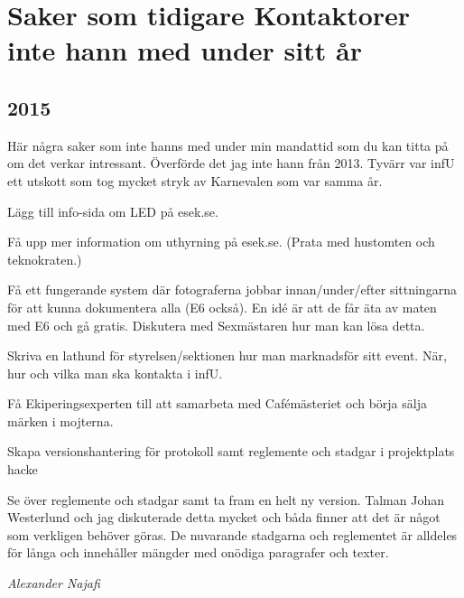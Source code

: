 \documentclass[10pt]{article}
\begin{document}
\section{Saker som tidigare Kontaktorer inte hann med under sitt år}

\subsection{2015}
Här några saker som inte hanns med under min mandattid som du kan titta på om det verkar intressant. Överförde det jag inte hann från 2013. Tyvärr var infU ett utskott som tog mycket stryk av Karnevalen som var samma år.
\begin{tightdashlist}
    \item Lägg till info-sida om LED på esek.se.
    \item Få upp mer information om uthyrning på esek.se. (Prata med hustomten och teknokraten.)
    \item Få ett fungerande system där fotograferna jobbar innan/under/efter sittningarna för att kunna dokumentera alla (E6 också). En idé är att de får äta av maten med E6 och gå gratis. Diskutera med Sexmästaren hur man kan lösa detta.
    \item Skriva en lathund för styrelsen/sektionen hur man marknadsför sitt event. När, hur och vilka man ska kontakta i infU.
    \item Få Ekiperingsexperten till att samarbeta med Cafémästeriet och börja sälja märken i mojterna.
    \item Skapa versionshantering för protokoll samt reglemente och stadgar i projektplats hacke
    \item Se över reglemente och stadgar samt ta fram en helt ny version. Talman Johan Westerlund och jag diskuterade detta mycket och båda finner att det är något som verkligen behöver göras. De nuvarande stadgarna och reglementet är alldeles för långa och innehåller mängder med onödiga paragrafer och texter.
\end{tightdashlist}

\emph{Alexander Najafi}
\end{document}
